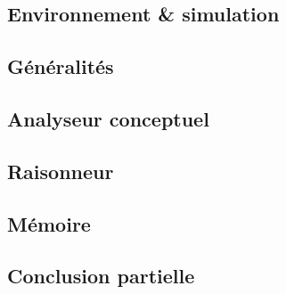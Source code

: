 \subsection{Environnement \& simulation}


\subsection{Généralités}


\subsection{Analyseur conceptuel}


\subsection{Raisonneur}


\subsection{Mémoire}


\subsection{Conclusion partielle}

